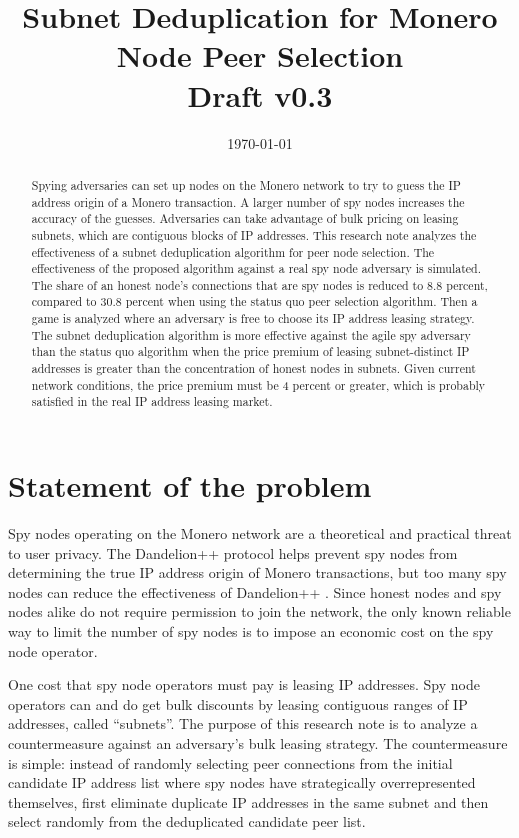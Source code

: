 \documentclass[english]{mrl}
\title{Subnet Deduplication for Monero Node Peer Selection\\\vspace{.3cm}
\large Draft v0.3}
\date{\today}
\theoremstyle{plain}
\begin{document}
\begin{abstract} Spying adversaries can set up nodes on the Monero network to try to guess the IP address origin of a Monero transaction. A larger number of spy nodes increases the accuracy of the guesses. Adversaries can take advantage of bulk pricing on leasing subnets, which are contiguous blocks of IP addresses. This research note analyzes the effectiveness of a subnet deduplication algorithm for peer node selection. The effectiveness of the proposed algorithm against a real spy node adversary is simulated. The share of an honest node's connections that are spy nodes is reduced to 8.8 percent, compared to 30.8 percent when using the status quo peer selection algorithm. Then a game is analyzed where an adversary is free to choose its IP address leasing strategy. The subnet deduplication algorithm is more effective against the agile spy adversary than the status quo algorithm when the price premium of leasing subnet-distinct IP addresses is greater than the concentration of honest nodes in subnets. Given current network conditions, the price premium must be 4 percent or greater, which is probably satisfied in the real IP address leasing market. \end{abstract}

\section{Statement of the problem}

Spy nodes operating on the Monero network are a theoretical and practical
threat to user privacy. The Dandelion++ protocol helps prevent spy
nodes from determining the true IP address origin of Monero transactions,
but too many spy nodes can reduce the effectiveness of Dandelion++
\cite{Fanti2018a}. Since honest nodes and spy nodes alike do not
require permission to join the network, the only known reliable way
to limit the number of spy nodes is to impose an economic cost on
the spy node operator.

One cost that spy node operators must pay is leasing IP addresses.
Spy node operators can and do get bulk discounts by leasing contiguous
ranges of IP addresses, called ``subnets''. The purpose of this
research note is to analyze a countermeasure against an adversary's
bulk leasing strategy. The countermeasure is simple: instead of randomly
selecting peer connections from the initial candidate IP address list
where spy nodes have strategically overrepresented themselves, first
eliminate duplicate IP addresses in the same subnet and then select
randomly from the deduplicated candidate peer list.
\end{document}
